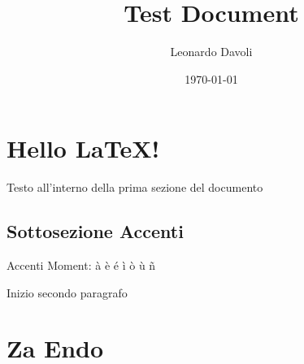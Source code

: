 \documentclass[a4paper]{article}
\author{Leonardo Davoli}
\title{Test Document}
\date{\today}
\begin{document}
\maketitle
\tableofcontents

\section{Hello \LaTeX!}
Testo all'interno della prima sezione del documento

\subsection{Sottosezione Accenti}
Accenti Moment: à è é ì ò ù \~n

Inizio secondo paragrafo
\section{Za Endo}
\end{document}
